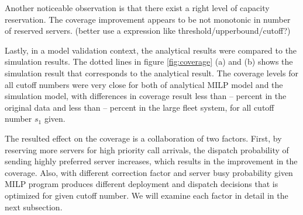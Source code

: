 \documentclass{article}
\begin{document}
Another noticeable observation is that there exist a right level of capacity reservation. The coverage improvement appears to be not monotonic in number of reserved servers. (better use a expression like threshold/upperbound/cutoff?)


Lastly, in a model validation context, the analytical results were compared to the simulation results. The dotted lines in figure \ref{fig:coverage} (a) and (b) shows the simulation result that corresponds to the analytical result. The coverage levels for all cutoff numbers were very close for both of analytical MILP model and the simulation model, with differences in coverage result less than -- percent in the original data and less than -- percent in the large fleet system, for all cutoff number $s_1$ given.


The resulted effect on the coverage is a collaboration of two factors. First, by reserving more servers for high priority call arrivals, the dispatch probability of sending highly preferred server increases, which results in the improvement in the coverage. Also, with different correction factor and server busy probability given MILP program produces different deployment and dispatch decisions that is optimized for given cutoff number. We will examine each factor in detail in the next subsection.


 
\end{document}
